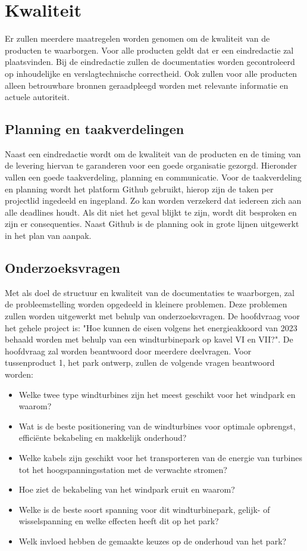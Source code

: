 \section{Kwaliteit}
Er zullen meerdere maatregelen worden genomen om de kwaliteit van de producten te waarborgen. Voor alle producten geldt dat er een eindredactie zal plaatsvinden. Bij de eindredactie zullen de documentaties worden gecontroleerd op inhoudelijke en verslagtechnische correctheid. Ook zullen voor alle producten alleen betrouwbare bronnen geraadpleegd worden met relevante informatie en actuele autoriteit. 

\subsection{Planning en taakverdelingen}
Naast een eindredactie wordt om de kwaliteit van de producten en de timing van de levering hiervan te garanderen voor een goede organisatie gezorgd. Hieronder vallen een goede taakverdeling, planning en communicatie. Voor de taakverdeling en planning wordt het platform Github gebruikt, hierop zijn de taken per projectlid ingedeeld en ingepland. Zo kan worden verzekerd dat iedereen zich aan alle deadlines houdt. Als dit niet het geval blijkt te zijn, wordt dit besproken en zijn er consequenties. Naast Github is de planning ook in grote lijnen uitgewerkt in het plan van aanpak. 

\subsection{Onderzoeksvragen}
Met als doel de structuur en kwaliteit van de documentaties te waarborgen, zal de probleemstelling worden opgedeeld in kleinere problemen. Deze problemen zullen worden uitgewerkt met behulp van onderzoeksvragen.\cite{projecthandleiding}
De hoofdvraag voor het gehele project is: "Hoe kunnen de eisen volgens het energieakkoord \cite{energieakkoord} van 2023 behaald worden met behulp van een windturbinepark op kavel VI en VII?". De hoofdvraag zal worden beantwoord door meerdere deelvragen. Voor tussenproduct 1, het park ontwerp, zullen de volgende vragen beantwoord worden\cite{projecthandleiding}:
\begin{itemize}
    \item Welke twee type windturbines zijn het meest geschikt voor het windpark en waarom?
    \item Wat is de beste positionering van de windturbines voor optimale opbrengst, efficiënte bekabeling en makkelijk onderhoud?  
    \item Welke kabels zijn geschikt voor het transporteren van de energie van turbines tot het hoogspanningsstation met de verwachte stromen?
    \item Hoe ziet de bekabeling van het windpark eruit en waarom?
    \item Welke is de beste soort spanning voor dit windturbinepark, gelijk- of wisselspanning en welke effecten heeft dit op het park?
    \item Welk invloed hebben de gemaakte keuzes op de onderhoud van het park? 
\end{itemize}

